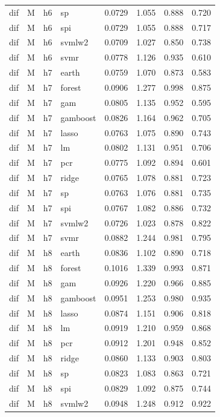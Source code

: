\begin{ThreePartTable}
\begin{longtable}[t]{llclcccc}
dif & M & h6 & sp & 0.0729 & 1.055 & 0.888 & 0.720\\
dif & M & h6 & spi & 0.0729 & 1.055 & 0.888 & 0.717\\
dif & M & h6 & svmlw2 & 0.0709 & 1.027 & 0.850 & 0.738\\
dif & M & h6 & svmr & 0.0778 & 1.126 & 0.935 & 0.610\\
\addlinespace
dif & M & h7 & earth & 0.0759 & 1.070 & 0.873 & 0.583\\
dif & M & h7 & forest & 0.0906 & 1.277 & 0.998 & 0.875\\
dif & M & h7 & gam & 0.0805 & 1.135 & 0.952 & 0.595\\
dif & M & h7 & gamboost & 0.0826 & 1.164 & 0.962 & 0.705\\
dif & M & h7 & lasso & 0.0763 & 1.075 & 0.890 & 0.743\\
dif & M & h7 & lm & 0.0802 & 1.131 & 0.951 & 0.706\\
dif & M & h7 & pcr & 0.0775 & 1.092 & 0.894 & 0.601\\
dif & M & h7 & ridge & 0.0765 & 1.078 & 0.881 & 0.723\\
dif & M & h7 & sp & 0.0763 & 1.076 & 0.881 & 0.735\\
dif & M & h7 & spi & 0.0767 & 1.082 & 0.886 & 0.732\\
dif & M & h7 & svmlw2 & 0.0726 & 1.023 & 0.878 & 0.822\\
dif & M & h7 & svmr & 0.0882 & 1.244 & 0.981 & 0.795\\
\addlinespace
dif & M & h8 & earth & 0.0836 & 1.102 & 0.890 & 0.718\\
dif & M & h8 & forest & 0.1016 & 1.339 & 0.993 & 0.871\\
dif & M & h8 & gam & 0.0926 & 1.220 & 0.966 & 0.885\\
dif & M & h8 & gamboost & 0.0951 & 1.253 & 0.980 & 0.935\\
dif & M & h8 & lasso & 0.0874 & 1.151 & 0.906 & 0.818\\
dif & M & h8 & lm & 0.0919 & 1.210 & 0.959 & 0.868\\
dif & M & h8 & pcr & 0.0912 & 1.201 & 0.948 & 0.852\\
dif & M & h8 & ridge & 0.0860 & 1.133 & 0.903 & 0.803\\
dif & M & h8 & sp & 0.0823 & 1.083 & 0.863 & 0.721\\
dif & M & h8 & spi & 0.0829 & 1.092 & 0.875 & 0.744\\
dif & M & h8 & svmlw2 & 0.0948 & 1.248 & 0.912 & 0.922\\

\end{longtable}
\end{ThreePartTable}

